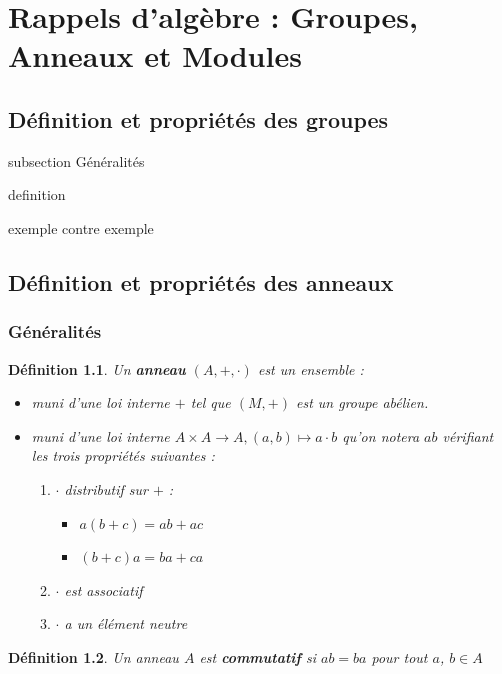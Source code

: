 \documentclass[a4paper,12pt]{report}  %
\theoremstyle{definitionstyle}
\newtheorem{definition}{Définition}[chapter] %
\theoremstyle{examplestyle}
\theoremstyle{remarkstyle}
\theoremstyle{propositionstyle}
\theoremstyle{theoremstyle}
\theoremstyle{proofstyle}
\begin{document}
	
	\chapter{Rappels d'algèbre : Groupes, Anneaux et Modules}

	\section{Définition et propriétés des groupes}
	
	
	subsection Généralités
	
	definition
	
	exemple contre exemple
	
	
	\section{Définition et propriétés des anneaux}
	
	\subsection{Généralités}
	
	\begin{definition}
		Un \textbf{anneau} $(A, +, \cdot)$ est un ensemble : 
		\begin{itemize}
			\item muni d'une loi interne $+$ tel que $(M, +)$ est un groupe abélien.
			\item muni d'une loi interne $A \times A \rightarrow A, (a, b) \mapsto a \cdot b$ qu'on notera $ab$ vérifiant les trois propriétés suivantes :
			
			\begin{enumerate}
				\item $\cdot$ distributif sur $+$ :
					\begin{itemize}
						\item $a(b + c) = ab + ac$
						\item $(b+c)a = ba+ca$
					\end{itemize}
				
				
				\item $\cdot$ est associatif
				
				\item $\cdot$ a un élément neutre
			\end{enumerate}
		\end{itemize}
	\end{definition}

	\begin{definition}
		Un anneau $A$ est \textbf{commutatif} si $ab = ba$ pour tout $a$, $b \in A$
	\end{definition}
	
\end{document}
